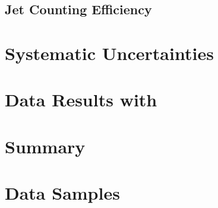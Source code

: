 \documentclass{cmspaper}
\begin{document}
     \subsection{Jet Counting Efficiency}
     

\section{Systematic Uncertainties}
   \label{sec:systematics}
   

  

\section{Data Results with \intlumi}

\section{Summary}
     \label{sec:summary}
     



\newpage 
\appendix
\appendixpage
\section{Data Samples}
  \label{app:datasets}
  
  
\end{document}
